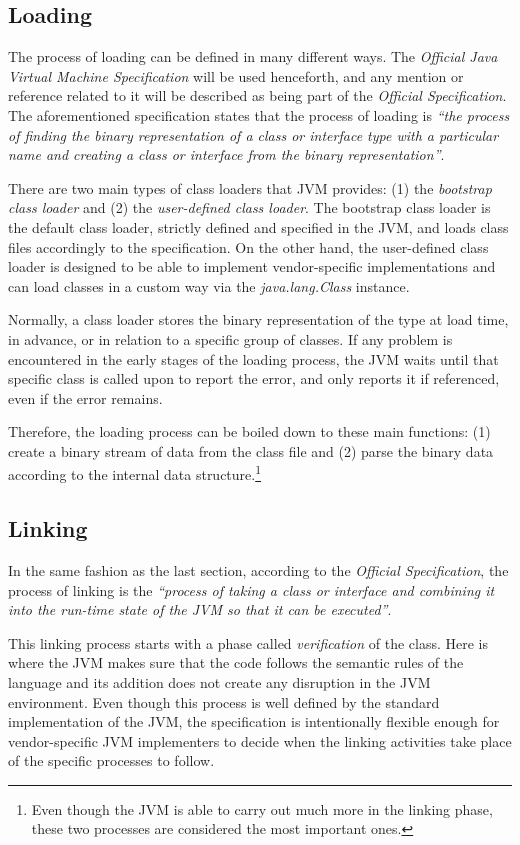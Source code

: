 \documentclass[english,runningheads,a4paper]{llncs}[2018/03/10]
\begin{document}
\subsection*{Loading}
The process of loading can be defined in many different ways. The
\textit{Official Java Virtual Machine Specification} will be used henceforth,
and any mention or reference related to it will be described as being part of
the \textit{Official Specification}. The aforementioned specification states
that the process of loading is \textit{``the process of finding the binary
representation of a class or interface type with a particular name and creating
a class or interface from the binary representation''}.

There are two main types of class loaders that JVM provides: (1) the
\textit{bootstrap class loader} and (2) the \textit{user-defined class loader}.
The bootstrap class loader is the default class loader, strictly defined and
specified in the JVM, and loads class files accordingly to the specification. On
the other hand, the user-defined class loader is designed to be able to
implement vendor-specific implementations and can load classes in a custom way
via the \textit{java.lang.Class} instance.

Normally, a class loader stores the binary representation of the type at load
time, in advance, or in relation to a specific group of classes. If any problem
is encountered in the early stages of the loading process, the JVM waits until
that specific class is called upon to report the error, and only reports it if
referenced, even if the error remains.

Therefore, the loading process can be boiled down to these main functions: (1)
create a binary stream of data from the class file and (2) parse the binary data
according to the internal data structure.\footnote{Even though the JVM is able
to carry out much more in the linking phase, these two processes are considered
the most important ones.}

\newpage
\subsection*{Linking}
In the same fashion as the last section, according to the \textit{Official
Specification}, the process of linking is the \textit{``process of taking a
class or interface and combining it into the run-time state of the JVM so that
it can be executed''}.

This linking process starts with a phase called \textit{verification} of the
class. Here is where the JVM makes sure that the code follows the semantic rules
of the language and its addition does not create any disruption in the JVM
environment. Even though this process is well defined by the standard
implementation of the JVM, the specification is intentionally flexible enough
for vendor-specific JVM implementers to decide when the linking activities take
place of the specific processes to follow.
\end{document}
